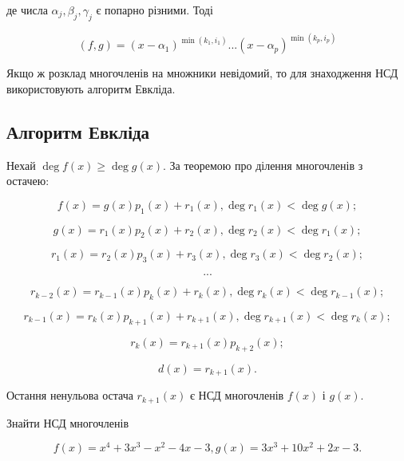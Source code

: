 де числа $\alpha_j, \beta_j, \gamma_j$ є попарно різними. Тоді

$$(f,g) = (x-\alpha_1)^{\min(k_1,i_1)}...(x-\alpha_p)^{\min(k_p,i_p)}$$

Якщо ж розклад многочленів на множники невідомий, то для знаходження
НСД використовують алгоритм Евкліда. 

\subsection{Алгоритм Евкліда}

Нехай $\deg f(x) \geqslant \deg g(x)$. За теоремою про ділення многочленів з остачею:

$$f(x) = g(x)p_1(x) + r_1(x), \deg r_1(x) < \deg g(x);$$

$$g(x) = r_1(x)p_2(x) + r_2(x), \deg r_2(x) < \deg r_1(x);$$

$$r_1(x) = r_2(x)p_3(x) + r_3(x), \deg r_3(x) < \deg r_2(x);$$

$$...$$

$$r_{k-2}(x) = r_{k-1}(x)p_k(x) + r_k(x), \deg r_k(x) < \deg r_{k-1}(x);$$

$$r_{k-1}(x) = r_{k}(x)p_{k+1}(x) + r_{k+1}(x), \deg r_{k+1}(x) < \deg r_{k}(x);$$

$$r_{k}(x) = r_{k+1}(x)p_{k+2}(x);$$

$$d(x) = r_{k+1}(x).$$

Остання ненульова остача $r_{k+1}(x)$ є НСД многочленів $f(x)$ і $g(x)$.

\begin{problem}
	Знайти НСД многочленів

	$$f(x) = x^4 + 3x^3 - x^2 - 4x - 3, g(x) = 3x^3 + 10x^2 + 2x -3.$$
\end{problem}

